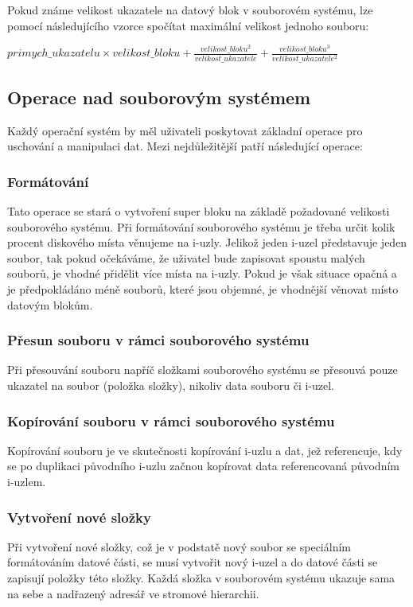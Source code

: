 \documentclass[12pt, a4paper]{article}
\begin{document}
Pokud známe velikost ukazatele na datový blok v souborovém systému, lze pomocí následujícího vzorce spočítat maximální velikost jednoho souboru:

\begin{center}
	$primych\_ukazatelu\times velikost\_bloku + \frac{velikost\_bloku^2}{velikost\_ukazatele} + \frac{velikost\_bloku^3}{velikost\_ukazatele^2} $ 
\end{center}

\subsection{Operace nad souborovým systémem}
	Každý operační systém by měl uživateli poskytovat základní operace pro uschování a manipulaci dat. Mezi nejdůležitější patří následující operace:
	
	\subsubsection{Formátování}
	Tato operace se stará o vytvoření super bloku na základě požadované velikosti souborového systému. Při formátování souborového systému je třeba určit kolik procent diskového místa věnujeme na i-uzly. Jelikož jeden i-uzel představuje jeden soubor, tak pokud očekáváme, že uživatel bude zapisovat spoustu malých souborů, je vhodné přidělit více místa na i-uzly. Pokud je však situace opačná a je předpokládáno méně souborů, které jsou objemné, je vhodnější věnovat místo datovým blokům.
	
	\subsubsection{Přesun souboru v rámci souborového systému}
	Při přesouvání souboru napříč složkami souborového systému se přesouvá pouze ukazatel na soubor (položka složky), nikoliv data souboru či i-uzel.
	
	\subsubsection{Kopírování souboru v rámci souborového systému}
	Kopírování souboru je ve skutečnosti kopírování i-uzlu a dat, jež referencuje, kdy se po duplikaci původního i-uzlu začnou kopírovat data referencovaná původním i-uzlem.

	\subsubsection{Vytvoření nové složky}
	Při vytvoření nové složky, což je v podstatě nový soubor se speciálním formátováním datové části, se musí vytvořit nový i-uzel a do datové části se zapisují položky této složky. Každá složka v souborovém systému ukazuje sama na sebe a nadřazený adresář ve stromové hierarchii.
	
\end{document}
